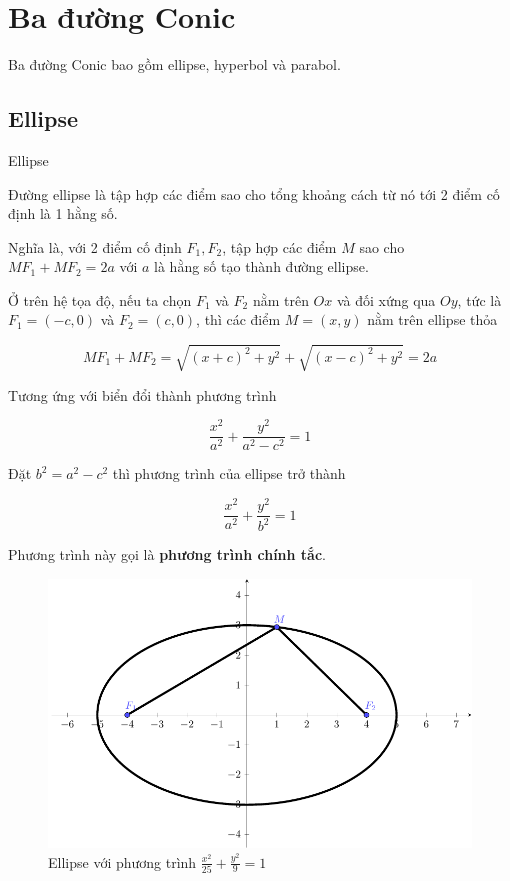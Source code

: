 \chapter{Ba đường Conic}

Ba đường Conic bao gồm ellipse, hyperbol và parabol.

\section{Ellipse}

\begin{defblock}{Ellipse}

    Đường ellipse là tập hợp các điểm sao cho tổng khoảng cách từ nó tới 2 điểm cố định là 1 hằng số.
\end{defblock}

Nghĩa là, với 2 điểm cố định $F_1, F_2$, tập hợp các điểm $M$ sao cho $M F_1 + M F_2 = 2a$ với $a$ là hằng số tạo thành đường ellipse.

Ở trên hệ tọa độ, nếu ta chọn $F_1$ và $F_2$ nằm trên $Ox$ và đối xứng qua $Oy$, tức là $F_1 = (-c, 0)$ và $F_2 = (c, 0)$, thì các điểm $M = (x, y)$ nằm trên ellipse thỏa

$$MF_1 + MF_2 = \sqrt{(x+c)^2 + y^2} + \sqrt{(x-c)^2 + y^2} = 2a$$

Tương ứng với biển đổi thành phương trình

$$\frac{x^2}{a^2} + \frac{y^2}{a^2 - c^2} = 1$$

Đặt $b^2 = a^2 - c^2$ thì phương trình của ellipse trở thành

$$\frac{x^2}{a^2} + \frac{y^2}{b^2} = 1$$

Phương trình này gọi là \textbf{phương trình chính tắc}.

\begin{figure}[ht]
    \centering
    \includegraphics[width=\textwidth]{pics/conics/ellipse.pdf}
    \caption{Ellipse với phương trình $\frac{x^2}{25} + \frac{y^2}{9} = 1$}
\end{figure}

